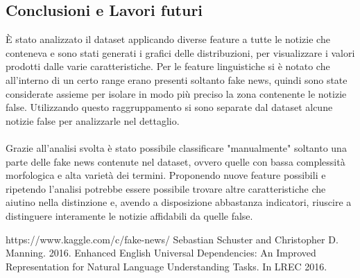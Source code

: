 \documentclass{article}
\begin{document}
\begin{multicols}{2}
		\section{Conclusioni e Lavori futuri}	
		È stato analizzato il dataset applicando diverse feature a tutte le notizie che conteneva e sono stati generati i grafici delle distribuzioni, per visualizzare i valori prodotti dalle varie caratteristiche. Per le feature linguistiche si è notato che all'interno di un certo range erano presenti soltanto fake news, quindi sono state considerate assieme per isolare in modo più preciso la zona contenente le notizie false. Utilizzando questo raggruppamento si sono separate dal dataset alcune notizie false per analizzarle nel dettaglio.
		\\~\\
		Grazie all'analisi svolta è stato possibile classificare "manualmente" soltanto una parte delle fake news contenute nel dataset, ovvero quelle con bassa complessità morfologica e alta varietà dei termini. Proponendo nuove feature possibili e ripetendo l'analisi potrebbe essere possibile trovare altre caratteristiche che aiutino nella distinzione e, avendo a disposizione abbastanza indicatori, riuscire a distinguere interamente le notizie affidabili da quelle false.
	   	\end{multicols}		       	


		\begin{thebibliography}{9}
				https://www.kaggle.com/c/fake-news/
				 Sebastian Schuster and Christopher D. Manning. 2016. Enhanced English Universal Dependencies: An Improved Representation for Natural Language Understanding Tasks. In LREC 2016. 
		\end{thebibliography}
\end{document}
